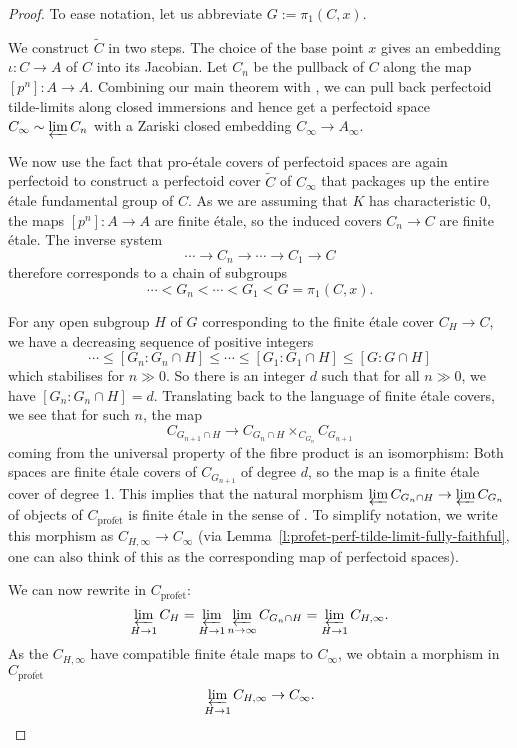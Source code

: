 \documentclass[10pt,oneside]{amsart}
\theoremstyle{definition}
\newcommand{\profet}{\operatorname{prof\acute{e}t}}
\begin{document}
\begin{proof}
To ease notation, let us abbreviate $G:=\pi_1(C,x)$.
	
We construct $\tilde{C}$ in two steps. 
The choice of the base point $x$ gives an embedding $\iota\colon C\rightarrow A$ of $C$ into its Jacobian. Let $C_n$ be the pullback of $C$ along the map $[p^n]\colon A\rightarrow A$. Combining our main theorem with \cite[Lemma II.2.2]{torsion}, we can pull back perfectoid tilde-limits along closed immersions and hence get a perfectoid space $C_\infty\sim \varprojlim C_n$ with a Zariski closed embedding $C_\infty\rightarrow A_\infty$.

We now use the fact that pro-\'etale covers of perfectoid spaces are again perfectoid to construct a perfectoid cover $\tilde{C}$ of $C_\infty$ that packages up the entire \'etale fundamental group of $C$. As we are assuming that $K$ has characteristic 0, the maps $[p^n]\colon A\rightarrow A$ are finite \'etale, so the induced covers $C_n\rightarrow C$ are finite \'etale. The inverse system 
\[\cdots \rightarrow C_n \rightarrow \cdots \rightarrow C_1\rightarrow C\] 
therefore corresponds to a chain of subgroups
\[\cdots < G_n <\cdots < G_1 < G=\pi_1(C,x).\]

For any open subgroup $H$ of $G$ corresponding to the finite \'etale cover $C_H\rightarrow C$, we have a decreasing sequence of positive integers 
\[\cdots \leq [G_n:G_n\cap H] \leq \cdots \leq [G_1:G_1\cap H]\leq [G:G\cap H]\]
which stabilises for $n\gg 0$.
So there is an integer $d$ such that for all $n\gg0 $, we have $[G_n:G_n\cap H]=d$. Translating back to the language of finite \'etale covers, we see that for such $n$, the map
\[C_{G_{n+1}\cap H}\rightarrow C_{G_n\cap H}\times_{C_{G_n}} C_{G_{n+1}}\]
coming from the universal property of the fibre product is an isomorphism: Both spaces are finite \'etale covers of $C_{G_{n+1}}$ of degree $d$, so the map is a finite \'etale cover of degree 1. This implies that the natural morphism $\varprojlim C_{G_n \cap H}\rightarrow \varprojlim C_{G_n}$ of objects of $C_{\profet}$ is finite \'etale in the sense of \cite[Definition 3.9]{p-adic_Hodge}. To simplify notation, we write this morphism as $C_{H,\infty}\rightarrow C_\infty$ (via Lemma~\ref{l:profet-perf-tilde-limit-fully-faithful}, one can also think of this as the corresponding map of perfectoid spaces).

We can now rewrite in $C_{\profet}$:
\[\displaystyle\varprojlim_{H\rightarrow 1} C_H=\varprojlim_{H\rightarrow 1}\displaystyle\varprojlim_{n\rightarrow \infty} C_{G_n\cap H}=\varprojlim_{H\rightarrow 1}C_{H,\infty}.\]
As the $C_{H,\infty}$ have compatible finite \'etale maps to $C_\infty$, we obtain a morphism in $C_{\profet}$
\[\varprojlim_{H\rightarrow 1}C_{H,\infty}\rightarrow C_\infty.\]


\end{proof}
\end{document}
